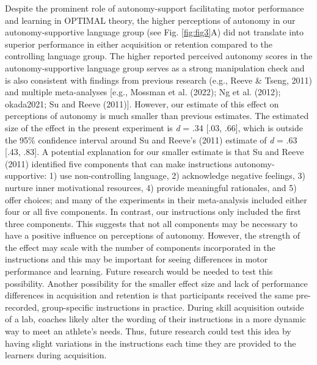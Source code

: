\documentclass[
  doc, donotrepeattitle,floatsintext]{apa7}
\begin{document}
Despite the prominent role of autonomy-support facilitating motor performance and learning in OPTIMAL theory, the higher perceptions of autonomy in our autonomy-supportive language group (see Fig. \ref{fig:fig3}A) did not translate into superior performance in either acquisition or retention compared to the controlling language group. The higher reported perceived autonomy scores in the autonomy-supportive language group serves as a strong manipulation check and is also consistent with findings from previous research (e.g., Reeve \& Tseng, 2011) and multiple meta-analyses {[}e.g., Mossman et al. (2022); Ng et al. (2012); okada2021; Su and Reeve (2011){]}. However, our estimate of this effect on perceptions of autonomy is much smaller than previous estimates. The estimated size of the effect in the present experiment is \emph{d} = .34 {[}.03, .66{]}, which is outside the 95\% confidence interval around Su and Reeve's (2011) estimate of \emph{d} = .63 {[}.43, .83{]}. A potential explanation for our smaller estimate is that Su and Reeve (2011) identified five components that can make instructions autonomy-supportive: 1) use non-controlling language, 2) acknowledge negative feelings, 3) nurture inner motivational resources, 4) provide meaningful rationales, and 5) offer choices; and many of the experiments in their meta-analysis included either four or all five components. In contrast, our instructions only included the first three components. This suggests that not all components may be necessary to have a positive influence on perceptions of autonomy. However, the strength of the effect may scale with the number of components incorporated in the instructions and this may be important for seeing differences in motor performance and learning. Future research would be needed to test this possibility. Another possibility for the smaller effect size and lack of performance differences in acquisition and retention is that participants received the same pre-recorded, group-specific instructions in practice. During skill acquisition outside of a lab, coaches likely alter the wording of their instructions in a more dynamic way to meet an athlete's needs. Thus, future research could test this idea by having slight variations in the instructions each time they are provided to the learners during acquisition.
\end{document}
